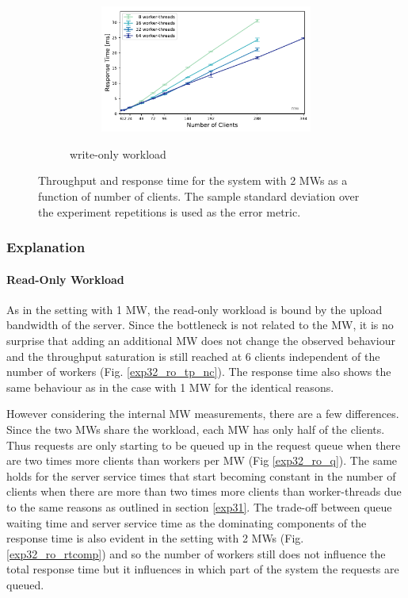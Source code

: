 \documentclass[report.tex]{subfiles}
\begin{document}
\begin{figure}[H]
\begin{subfigure}{\linewidth}
\begin{subfigure}[b]{.49\linewidth}
	\end{subfigure}\hfill
	\begin{subfigure}[b]{.49\linewidth}
		\centering
		\includegraphics[width=\linewidth]{data/exp32_wo_rt_nc_w.pdf}
	\end{subfigure}%
	\caption{write-only workload}\label{exp32_wo_tp_nc}
\end{subfigure}
\caption{Throughput and response time for the system with 2 MWs as a function of number of clients. The sample standard deviation over the experiment repetitions is used as the error metric.}
\end{figure}


\subsubsection{Explanation}

\paragraph{Read-Only Workload}

As in the setting with 1 MW, the read-only workload is bound by the upload bandwidth of the server. Since the bottleneck is not related to the MW, it is no surprise that adding an additional MW does not change the observed behaviour and the throughput saturation is still reached at 6 clients independent of the number of workers (Fig. \ref{exp32_ro_tp_nc}). The response time also shows the same behaviour as in the case with 1 MW for the identical reasons.

However considering the internal MW measurements, there are a few differences.
Since the two MWs share the workload, each MW has only half of the clients.
Thus requests are only starting to be queued up in the request queue when there are two times more clients than workers per MW (Fig \ref{exp32_ro_q}).
The same holds for the server service times that start becoming constant in the number of clients when there are more than two times more clients than worker-threads due to the same reasons as outlined in section \ref{exp31}. 
The trade-off between queue waiting time and server service time as the dominating components of the response time is also evident in the setting with 2 MWs (Fig. \ref{exp32_ro_rtcomp}) and so the number of workers still does not influence the total response time but it influences in which part of the system the requests are queued.
\end{document}
